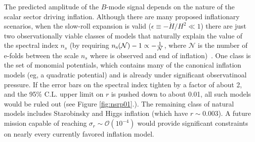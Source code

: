 
The predicted amplitude of the $B$-mode signal depends on the nature of the scalar sector driving inflation. Although there are many proposed inflationary scenarios, when the slow-roll expansion is valid ($\epsilon\equiv-\dot{H}/H^2\ll1$) there are just two observationally viable classes of models that naturally explain the value of the spectral index $n_s$ (by requiring $n_{\rm s}(\mathcal{N})-1\propto-\frac{1}{\mathcal{N}}$, where $\mathcal{N}$ is the number of e-folds between the scale $n_s$ where is observed and end of inflation)~\cite{Mukhanov:2013tua,Roest:2013fha,Creminelli:2014nqa}. One class is the set of monomial potentials, which contains many of the canonical inflation models (eg, a quadratic potential) and is already under significant observatinoal pressure. If the error bars on the spectral index tighten by a factor of about 2, and the 95\% C.L. upper limit on $r$ is pushed down to about 0.01, all such models would be ruled out (see Figure \ref{fig:nsrp01}.). The remaining class of natural models includes Starobinsky and Higgs inflation (which have $r\sim0.003$). A future mission capable of reaching $\sigma_r\sim\mathcal{O}(10^{-4})$ would provide significant constraints on nearly every currently favored inflation model.
